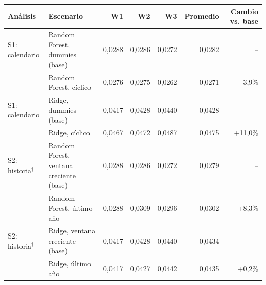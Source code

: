 \begin{tabular}{llrrrrr}
\toprule
Análisis & Escenario & W1 & W2 & W3 & Promedio & Cambio vs. base \\
\midrule
S1: calendario & Random Forest, dummies (base) & 0{,}0288 & 0{,}0286 & 0{,}0272 & 0{,}0282 & -- \\
 & Random Forest, cíclico & 0{,}0276 & 0{,}0275 & 0{,}0262 & 0{,}0271 & -3{,}9\% \\
S1: calendario & Ridge, dummies (base) & 0{,}0417 & 0{,}0428 & 0{,}0440 & 0{,}0428 & -- \\
 & Ridge, cíclico & 0{,}0467 & 0{,}0472 & 0{,}0487 & 0{,}0475 & +11{,}0\% \\
\midrule
S2: historia$^\dagger$ & Random Forest, ventana creciente (base) & 0{,}0288 & 0{,}0286 & 0{,}0272 & 0{,}0279 & -- \\
 & Random Forest, último año & 0{,}0288 & 0{,}0309 & 0{,}0296 & 0{,}0302 & +8{,}3\% \\
S2: historia$^\dagger$ & Ridge, ventana creciente (base) & 0{,}0417 & 0{,}0428 & 0{,}0440 & 0{,}0434 & -- \\
 & Ridge, último año & 0{,}0417 & 0{,}0427 & 0{,}0442 & 0{,}0435 & +0{,}2\% \\
\bottomrule
\end{tabular}